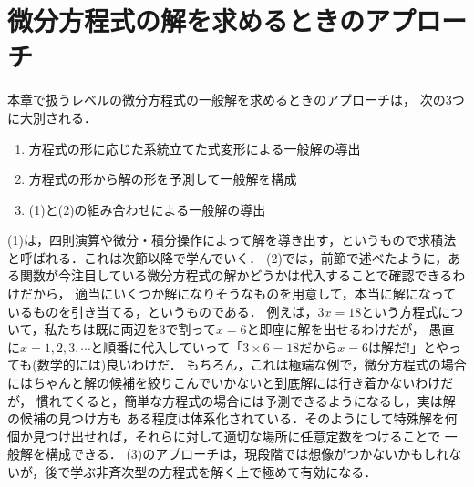 \section{微分方程式の解を求めるときのアプローチ}
%
本章で扱うレベルの微分方程式の一般解を求めるときのアプローチは，
次の3つに大別される．
\begin{enumerate}[(1)]
  \item 方程式の形に応じた系統立てた式変形による一般解の導出
  \item 方程式の形から解の形を予測して一般解を構成
  \item (1)と(2)の組み合わせによる一般解の導出 
\end{enumerate}
%
(1)は，四則演算や微分・積分操作によって解を導き出す，というもので求積法と呼ばれる．これは次節以降で学んでいく．
(2)では，前節で述べたように，ある関数が今注目している微分方程式の解かどうかは代入することで確認できるわけだから，
適当にいくつか解になりそうなものを用意して，本当に解になっているものを引き当てる，というものである．
例えば，$3x=18$という方程式について，私たちは既に両辺を3で割って$x=6$と即座に解を出せるわけだが，
愚直に$x=1,2,3,\cdots$と順番に代入していって「$3\times 6=18$だから$x=6$は解だ!」とやっても(数学的には)良いわけだ．
もちろん，これは極端な例で，微分方程式の場合にはちゃんと解の候補を絞りこんでいかないと到底解には行き着かないわけだが，
慣れてくると，簡単な方程式の場合には予測できるようになるし，実は解の候補の見つけ方も
ある程度は体系化されている．そのようにして特殊解を何個か見つけ出せれば，それらに対して適切な場所に任意定数をつけることで
一般解を構成できる．
(3)のアプローチは，現段階では想像がつかないかもしれないが，後で学ぶ非斉次型の方程式を解く上で極めて有効になる．

